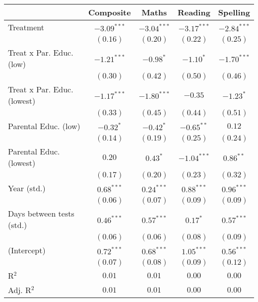 
\begin{table}
\begin{center}
\begin{tabular}{l c c c c}
\hline
 & Composite & Maths & Reading & Spelling \\
\hline
Treatment                   & $-3.09^{***}$ & $-3.04^{***}$ & $-3.17^{***}$ & $-2.84^{***}$ \\
                            & $(0.16)$      & $(0.20)$      & $(0.22)$      & $(0.25)$      \\
Treat x Par. Educ. (low)    & $-1.21^{***}$ & $-0.98^{*}$   & $-1.10^{*}$   & $-1.70^{***}$ \\
                            & $(0.30)$      & $(0.42)$      & $(0.50)$      & $(0.46)$      \\
Treat x Par. Educ. (lowest) & $-1.17^{***}$ & $-1.80^{***}$ & $-0.35$       & $-1.23^{*}$   \\
                            & $(0.33)$      & $(0.45)$      & $(0.44)$      & $(0.51)$      \\
Parental Educ. (low)        & $-0.32^{*}$   & $-0.42^{*}$   & $-0.65^{**}$  & $0.12$        \\
                            & $(0.14)$      & $(0.19)$      & $(0.25)$      & $(0.24)$      \\
Parental Educ. (lowest)     & $0.20$        & $0.43^{*}$    & $-1.04^{***}$ & $0.86^{**}$   \\
                            & $(0.17)$      & $(0.20)$      & $(0.23)$      & $(0.32)$      \\
Year (std.)                 & $0.68^{***}$  & $0.24^{***}$  & $0.88^{***}$  & $0.96^{***}$  \\
                            & $(0.06)$      & $(0.07)$      & $(0.09)$      & $(0.09)$      \\
Days between tests (std.)   & $0.46^{***}$  & $0.57^{***}$  & $0.17^{*}$    & $0.57^{***}$  \\
                            & $(0.06)$      & $(0.06)$      & $(0.08)$      & $(0.09)$      \\
(Intercept)                 & $0.72^{***}$  & $0.68^{***}$  & $1.05^{***}$  & $0.56^{***}$  \\
                            & $(0.07)$      & $(0.08)$      & $(0.09)$      & $(0.12)$      \\
\hline
R$^2$                       & $0.01$        & $0.01$        & $0.00$        & $0.00$        \\
Adj. R$^2$                  & $0.01$        & $0.01$        & $0.00$        & $0.00$        \\

\end{tabular}
\end{center}
\end{table}
